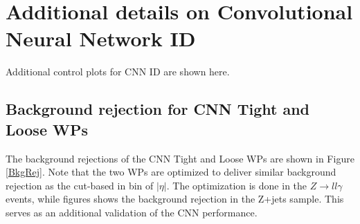\chapter{Additional details on Convolutional Neural Network ID}
\label{Adx2}
Additional control plots for CNN ID are shown here.

\section{Background rejection for CNN Tight and Loose WPs}
\label{Adx2:BkgRej}
The background rejections of the CNN Tight and Loose WPs are shown in Figure \ref{BkgRej}. Note that the two WPs are optimized to deliver similar background rejection as the cut-based in bin of $|\eta|$. The optimization is done in the $Z\rightarrow ll\gamma$ events, while figures shows the background rejection in the Z+jets sample. This serves as an additional validation of the CNN performance. 

